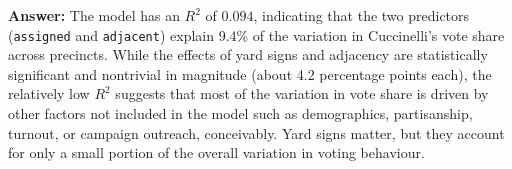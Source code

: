 \documentclass[12pt,letterpaper]{article}
\begin{document}
\begin{enumerate}
	\textbf{Answer:}  
	The model has an $R^2$ of $0.094$, indicating that the two predictors (\texttt{assigned} and \texttt{adjacent}) explain 9.4\% of the variation in Cuccinelli’s vote share across precincts. While the effects of yard signs and adjacency are statistically significant and nontrivial in magnitude (about 4.2 percentage points each), the relatively low $R^2$ suggests that most of the variation in vote share is driven by other factors not included in the model such as demographics, partisanship, turnout, or campaign outreach, conceivably. Yard signs matter, but they account for only a small portion of the overall variation in voting behaviour.
	
\end{enumerate}  
\end{document}
